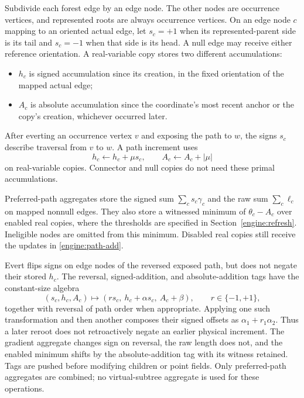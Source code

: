 Subdivide each forest edge by an edge node.  The other nodes are
occurrence vertices, and represented roots are always occurrence
vertices.  On an edge node $c$ mapping to an oriented actual edge, let
$s_c=+1$ when its represented-parent side is its tail and $s_c=-1$ when
that side is its head.  A null edge may receive either reference
orientation.  A real-variable copy stores two different accumulations:
\begin{itemize}
\item $h_c$ is signed accumulation since its creation, in the fixed
orientation of the mapped actual edge;
\item $A_c$ is absolute accumulation since the coordinate's most recent
anchor or the copy's creation, whichever occurred later.
\end{itemize}
After everting an occurrence vertex $v$ and exposing the path to $w$,
the signs $s_c$ describe traversal from $v$ to $w$.  A path increment
uses
\begin{equation}\label{engine:path-add}
                    h_c\leftarrow h_c+\mu s_c,
                    \qquad A_c\leftarrow A_c+|\mu|
\end{equation}
on real-variable copies.  Connector and null copies do not need these
primal accumulations.

Preferred-path aggregates store the signed sum
$\sum_c s_c\gamma_c$ and the raw sum $\sum_c\ell_c$ on mapped nonnull
edges.  They also store a witnessed minimum of $\theta_c-A_c$ over
enabled real copies, where the thresholds are specified in
Section~\ref{engine:refresh}.  Ineligible nodes are omitted from this
minimum.  Disabled real copies still receive the updates in
\eqref{engine:path-add}.

Evert flips signs on edge nodes of the reversed exposed path, but does
not negate their stored $h_c$.  The reversal, signed-addition, and
absolute-addition tags have the constant-size algebra
\begin{equation}\label{engine:tag-algebra}
 (s_c,h_c,A_c)\longmapsto
       (r s_c,\ h_c+\alpha s_c,\ A_c+\beta),\qquad r\in\{-1,+1\},
\end{equation}
together with reversal of path order when appropriate.  Applying one
such transformation and then another composes their signed offsets as
$\alpha_1+r_1\alpha_2$.  Thus a later reroot does not retroactively
negate an earlier physical increment.  The gradient aggregate changes
sign on reversal, the raw length does not, and the enabled minimum
shifts by the absolute-addition tag with its witness retained.  Tags are
pushed before modifying children or point fields.  Only preferred-path
aggregates are combined; no virtual-subtree aggregate is used for these
operations.

